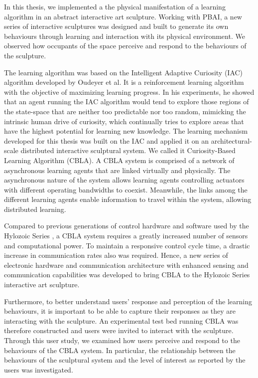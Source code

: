 In this thesis, we implemented a the physical manifestation of a learning algorithm in an abstract interactive art sculpture. Working with PBAI, a new series of interactive sculptures was designed and built to generate its own behaviours through learning and interaction with its physical environment. We observed how occupants of the space perceive and respond to the behaviours of the sculpture. 

The learning algorithm was based on the Intelligent Adaptive Curiosity \cite{Oudeyer2007} (IAC) algorithm developed by Oudeyer et al. It is a reinforcement learning algorithm with the objective of maximizing learning progress. In his experiments, he showed that an agent running the IAC algorithm would tend to explore those regions of the state-space that are neither too predictable nor too random, mimicking the intrinsic human drive of curiosity, which continually tries to explore areas that have the highest potential for learning new knowledge. The learning mechanism developed for this thesis was built on the IAC and applied it on an architectural-scale distributed interactive sculptural system. We called it Curiosity-Based Learning Algorithm (CBLA). A CBLA system is comprised of a network of asynchronous learning agents that are linked virtually and physically. The asynchronous nature of the system allows learning agents controlling actuators with different operating bandwidths to coexist. Meanwhile, the links among the different learning agents enable information to travel within the system, allowing distributed learning.

Compared to previous generations of control hardware and software used by the Hylozoic Series \cite{Beesley2010-1}, a CBLA system requires a greatly increased number of sensors and computational power. To maintain a responsive control cycle time, a drastic increase in communication rates also was required. Hence, a new series of electronic hardware and communication architecture with enhanced sensing and communication capabilities was developed to bring CBLA to the Hylozoic Series interactive art sculpture. 

Furthermore, to better understand users' response and perception of the learning behaviours, it is important to be able to capture their responses as they are interacting with the sculpture. An experimental test bed running CBLA was therefore constructed and users were invited to interact with the sculpture. Through this user study, we examined how users perceive and respond to the behaviours of the CBLA system. In particular, the relationship between the behaviours of the sculptural system and the level of interest as reported by the users was investigated. 

